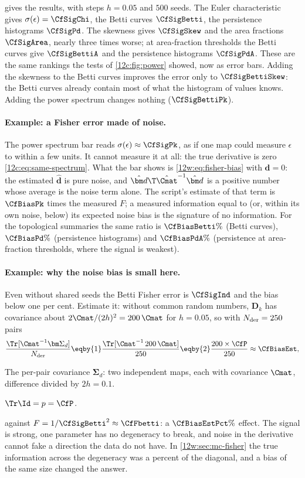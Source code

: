  gives the results, with steps $h=0.05$ and $500$ seeds. The Euler characteristic gives $\sigma(\epsilon)=\CfSigChi$,
the Betti curves $\CfSigBetti$, the persistence histograms $\CfSigPd$. The skewness gives $\CfSigSkew$ and the area fractions
$\CfSigArea$, nearly three times worse; at area-fraction thresholds the Betti curves give $\CfSigBettiA$ and the persistence
histograms $\CfSigPdA$. These are the same rankings the tests of \cref{12c:fig:power} showed, now as error bars. Adding the
skewness to the Betti curves improves the error only to $\CfSigBettiSkew$: the Betti curves already contain most of what the
histogram of values knows. Adding the power spectrum changes nothing ($\CfSigBettiPk$).

\paragraph{Example: a Fisher error made of noise.} The power spectrum bar reads $\sigma(\epsilon)\approx\CfSigPk$, as if one map
could measure $\epsilon$ to within a few units. It cannot measure it at all: the true derivative is zero
\eqref{12c:eq:same-spectrum}. What the bar shows is \eqref{12w:eq:fisher-bias} with $\bm d=0$: the estimated $\hat{\bm d}$ is pure
noise, and $\hat{\bm d}\T\hat\Cmat^{-1}\hat{\bm d}$ is a positive number whose average is the noise term alone. The script's
estimate of that term is $\CfBiasPk$ times the measured $F$; a measured information equal to (or, within its own noise, below) its
expected noise bias is the signature of no information. For the topological summaries the same ratio is $\CfBiasBetti\%$ (Betti
curves), $\CfBiasPd\%$ (persistence histograms) and $\CfBiasPdA\%$ (persistence at area-fraction thresholds, where the signal is
weakest).

\paragraph{Example: why the noise bias is small here.} Even without shared seeds the Betti Fisher error is $\CfSigInd$ and the bias
below one per cent. Estimate it: without common random numbers, $\bm D_k$ has covariance about $2\Cmat/(2h)^2=200\,\Cmat$ for
$h=0.05$, so with $N_{\rm der}=250$ pairs
\begin{align*}
  \frac{\Tr[\Cmat^{-1}\bm\Sigma_d]}{N_{\rm der}}
  \eqby{1}\frac{\Tr[\Cmat^{-1}\,200\,\Cmat]}{250}
  \eqby{2}\frac{200\times\CfP}{250}\approx\CfBiasEst ,
\end{align*}
\begin{explain}
  \item The per-pair covariance $\bm\Sigma_d$: two independent maps, each with covariance $\Cmat$, difference divided by $2h=0.1$.
  \item $\Tr\Id=p=\CfP$.
\end{explain}
against $F=1/\CfSigBetti^2\approx\CfFbetti$: a $\CfBiasEstPct\%$ effect. The signal is strong, one parameter has no degeneracy to break, and noise in
the derivative cannot fake a direction the data do not have. In \cref{12w:sec:mc-fisher} the true information across the degeneracy
was a percent of the diagonal, and a bias of the same size changed the answer.


